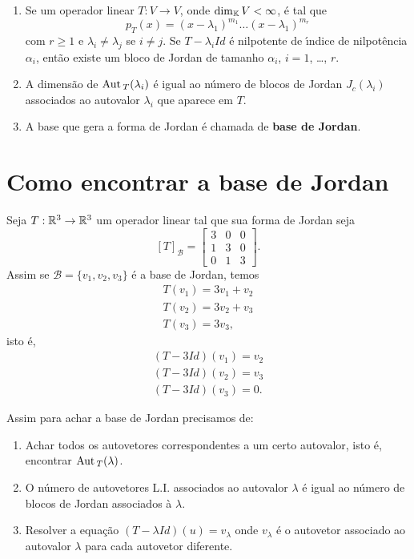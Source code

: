\begin{observacao}
	\begin{enumerate}
		\item  Se um operador linear $T : V \to V$, onde $\dim_{\mathbb{K}} V < \infty$, \'e tal que
			\[
				p_T(x) = (x - \lambda_1)^{m_1}\dots(x - \lambda_1)^{m_r}
			\]
		com $r \ge 1$ e $\lambda_i \ne \lambda_j$ se $i \ne j$. Se $T - \lambda_i Id$ \'e nilpotente de {\'\i}ndice de nilpot\^encia $\alpha_i$, ent\~ao existe um bloco de Jordan de tamanho $\alpha_i$, $i = 1$, \dots, $r$.
		\item A dimens\~ao de ${\rm Aut\,}_T(\lambda_i)$ \'e igual ao n\'umero de blocos de Jordan $J_c(\lambda_i)$ associados ao autovalor $\lambda_i$ que aparece em $T$.
		\item A base que gera a forma de Jordan \'e chamada de \textbf{base de Jordan}.
	\end{enumerate}
\end{observacao}


\section{Como encontrar a base de Jordan} %
\label{sec:base_de_jordan}

Seja $T : \mathbb{R}^3 \to \mathbb{R}^3$ um operador linear tal que sua forma de Jordan seja
\[
	[T]_\mathcal{B} = \begin{bmatrix}
		3 & 0 & 0\\
		1 & 3 & 0\\
		0 & 1 & 3
	\end{bmatrix}.
\]
Assim se $\mathcal{B} = \{v_1, v_2, v_3\}$ \'e a base de Jordan, temos
\begin{align*}
	T(v_1) = 3v_1 + v_2\\
	T(v_2) = 3v_2 + v_3\\
	T(v_3) = 3v_3,
\end{align*}
isto \'e,
\begin{align*}
	(T- 3Id)(v_1) = v_2\\
	(T - 3Id)(v_2) = v_3\\
	(T - 3Id)(v_3) = 0.
\end{align*}

Assim para achar a base de Jordan precisamos de:
\begin{enumerate}
	\item Achar todos os autovetores correspondentes a um certo autovalor, isto \'e, encontrar ${\rm Aut\,}_T(\lambda)$.
	\item O n\'umero de autovetores L.I. associados ao autovalor $\lambda$ \'e igual ao n\'umero de blocos de Jordan associados \`a $\lambda$.
	\item Resolver a equa\c{c}\~ao $(T - \lambda Id)(u) = v_\lambda$ onde $v_\lambda$ \'e o autovetor associado ao autovalor $\lambda$ para cada autovetor diferente.
\end{enumerate}


